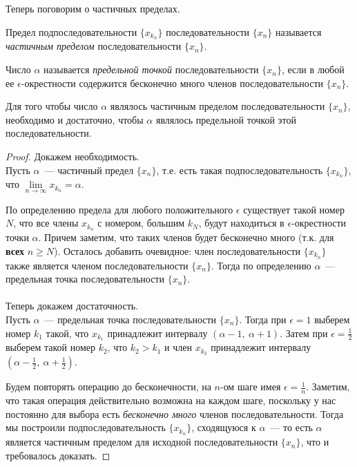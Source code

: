 Теперь поговорим о частичных пределах.

\begin{definition}
Предел подпоследовательности \(\{x_{k_{n}}\}\) последовательности \(\{x_{n}\}\)
называется \textit{частичным пределом} последовательности \(\{x_{n}\}\).
\end{definition}

\begin{definition}
Число \(\alpha\) называется \textit{предельной точкой} последовательности \(\{x_{n}\}\),
если в любой ее \(\epsilon\)-окрестности содержится бесконечно
много членов последовательности \(\{x_{n}\}\).
\end{definition}

\begin{theorem}
Для того чтобы число \(\alpha\) являлось частичным пределом последовательности \(\{x_{n}\}\),
необходимо и достаточно, чтобы \(\alpha\) являлось предельной точкой этой последовательности.

\begin{proof}
Докажем необходимость. \\
Пусть \(\alpha\)~--- частичный предел \(\{x_{n}\}\), т.е. есть такая подпоследовательность
\(\{x_{k_{n}}\}\), что \(\lim\limits_{n \to \infty}{x_{k_{n}}} = \alpha.\)

По определению предела для любого положительного \(\epsilon\) существует такой номер \(N\),
что все члены \(x_{k_{n}}\) с номером, большим \(k_{N}\), будут находиться
в \(\epsilon\)-окрестности точки \(\alpha\). Причем заметим, что таких членов
будет бесконечно много (т.к. для \textbf{всех} \(n \geq N\)). Осталось добавить очевидное:
член последовательности \(\{x_{k_{n}}\}\) также является
членом последовательности \(\{x_{n}\}\). Тогда по определению
\(\alpha\)~--- предельная точка последовательности \(\{x_{n}\}\).\\
\\
Теперь докажем достаточность. \\
Пусть \(\alpha\)~--- предельная точка последовательности \(\{x_{n}\}\).
Тогда при \(\epsilon=1\) выберем номер \(k_{1}\) такой, что \(x_{k_{1}}\) принадлежит
интервалу \((\alpha - 1, ~ \alpha + 1)\). Затем при \(\epsilon = \frac{1}{2}\) выберем
такой номер \(k_{2}\), что \(k_{2} > k_{1}\) и член \(x_{k_{2}}\) принадлежит
интервалу \(\left( \alpha - \frac{1}{2}, ~ \alpha + \frac{1}{2} \right)\).

Будем повторять операцию до бесконечности, на \(n\)-ом шаге имея \(\epsilon = \frac{1}{n}\).
Заметим, что такая операция действительно возможна на каждом шаге, поскольку
у нас постоянно для выбора есть \textit{бесконечно много} членов последовательности.
Тогда мы построили подпоследовательность \(\{x_{k_{n}}\}\), сходящуюся к \(\alpha\)~---
то есть \(\alpha\) является частичным пределом для исходной последовательности \(\{x_{n}\}\),
что и требовалось доказать.
\end{proof}
\end{theorem}

